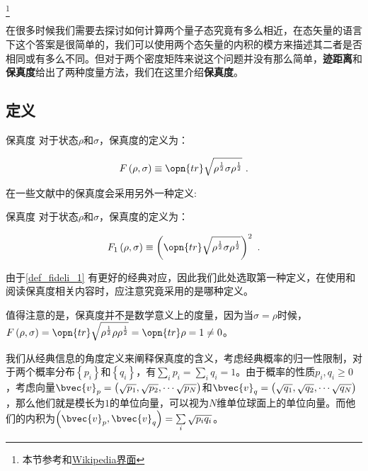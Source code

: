 
\footnote{本节参考\cite{量子信息}和\href{https://en.wikipedia.org/wiki/Trace_distance}{Wikipedia界面}}

在很多时候我们需要去探讨如何计算两个量子态究竟有多么相近，在态矢量的语言下这个答案是很简单的，我们可以使用两个态矢量的内积的模方来描述其二者是否相同或有多么不同。但对于两个密度矩阵来说这个问题并没有那么简单，\textbf{迹距离}和\textbf{保真度}给出了两种度量方法，我们在这里介绍\textbf{保真度}。

\subsection{定义}

\begin{definition}{保真度}\label{def_fideli_1}
对于状态$\rho$和$\sigma$，保真度的定义为：

\begin{equation}
F\left(\rho, \sigma\right)\equiv\opn{tr}\sqrt{\rho^{\frac{1}{2}}\sigma\rho^{\frac{1}{2}}}~.
\end{equation}

\end{definition}

在一些文献中的保真度会采用另外一种定义:

\begin{definition}{保真度}
对于状态$\rho$和$\sigma$，保真度的定义为：

\begin{equation}
F_1\left(\rho, \sigma\right)\equiv\left(\opn{tr}\sqrt{\rho^{\frac{1}{2}}\sigma\rho^{\frac{1}{2}}}\right)^2~.
\end{equation}
\end{definition}

由于\autoref{def_fideli_1} 有更好的经典对应，因此我们此处选取第一种定义，在使用和阅读保真度相关内容时，应注意究竟采用的是哪种定义。

值得注意的是，保真度并不是数学意义上的度量，因为当$\sigma = \rho$时候，$F\left(\rho, \sigma\right) = \opn{tr}\sqrt{\rho^{\frac{1}{2}}\rho\rho^{\frac{1}{2}}} = \opn{tr}\rho = 1 \neq 0$。

我们从经典信息的角度定义来阐释保真度的含义，考虑经典概率的归一性限制，对于两个概率分布$\left\{p_i\right\}$和$\left\{q_i\right\}$，有$\sum\limits_i p_i = \sum\limits_i q_i = 1$。由于概率的性质$p_i,q_i\geqslant 0$，考虑向量$\bvec{v}_p = \left( \sqrt{p_1},\sqrt{p_2},\cdots\sqrt{p_N}\right)$和$\bvec{v}_q = \left( \sqrt{q_1},\sqrt{q_2},\cdots\sqrt{q_N}\right)$，那么他们就是模长为$1$的单位向量，可以视为$N$维单位球面上的单位向量。而他们的内积为$\left(\bvec{v}_p,\bvec{v}_q\right) = \sum\limits_i\sqrt{p_iq_i}$。

